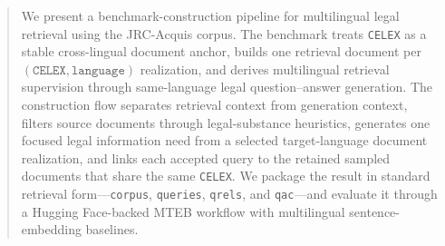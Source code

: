\begin{abstract}
We present a benchmark-construction pipeline for multilingual legal retrieval using the JRC-Acquis corpus. The benchmark treats \texttt{CELEX} as a stable cross-lingual document anchor, builds one retrieval document per \((\texttt{CELEX}, \texttt{language})\) realization, and derives multilingual retrieval supervision through same-language legal question--answer generation. The construction flow separates retrieval context from generation context, filters source documents through legal-substance heuristics, generates one focused legal information need from a selected target-language document realization, and links each accepted query to the retained sampled documents that share the same \texttt{CELEX}. We package the result in standard retrieval form---\texttt{corpus}, \texttt{queries}, \texttt{qrels}, and \texttt{qac}---and evaluate it through a Hugging Face-backed MTEB workflow with multilingual sentence-embedding baselines.
\end{abstract}
